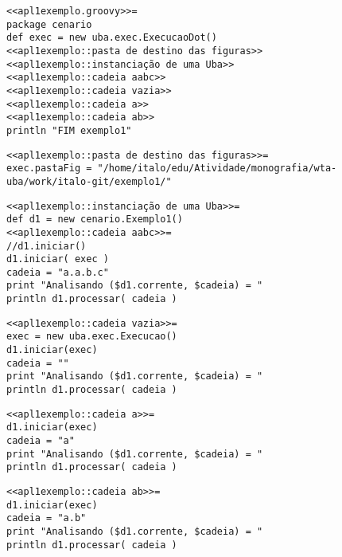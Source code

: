 

\begin{lstlisting}
<<apl1exemplo.groovy>>=
package cenario
def exec = new uba.exec.ExecucaoDot()
<<apl1exemplo::pasta de destino das figuras>>
<<apl1exemplo::instanciação de uma Uba>>
<<apl1exemplo::cadeia aabc>>
<<apl1exemplo::cadeia vazia>>
<<apl1exemplo::cadeia a>>
<<apl1exemplo::cadeia ab>>
println "FIM exemplo1"
\end{lstlisting}

\begin{lstlisting}
<<apl1exemplo::pasta de destino das figuras>>=
exec.pastaFig = "/home/italo/edu/Atividade/monografia/wta-uba/work/italo-git/exemplo1/"
\end{lstlisting}

\begin{lstlisting}
<<apl1exemplo::instanciação de uma Uba>>=
def d1 = new cenario.Exemplo1()
<<apl1exemplo::cadeia aabc>>=
//d1.iniciar()
d1.iniciar( exec )
cadeia = "a.a.b.c"
print "Analisando ($d1.corrente, $cadeia) = "
println d1.processar( cadeia )
\end{lstlisting}

\begin{lstlisting}
<<apl1exemplo::cadeia vazia>>=
exec = new uba.exec.Execucao()
d1.iniciar(exec)
cadeia = ""
print "Analisando ($d1.corrente, $cadeia) = "
println d1.processar( cadeia )
\end{lstlisting}

\begin{lstlisting}
<<apl1exemplo::cadeia a>>=
d1.iniciar(exec)
cadeia = "a"
print "Analisando ($d1.corrente, $cadeia) = "
println d1.processar( cadeia )
\end{lstlisting}

\begin{lstlisting}
<<apl1exemplo::cadeia ab>>=
d1.iniciar(exec)
cadeia = "a.b"
print "Analisando ($d1.corrente, $cadeia) = "
println d1.processar( cadeia )
\end{lstlisting}
